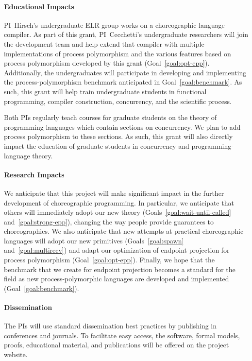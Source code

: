 \paragraph{Educational Impacts}
PI~Hirsch's undergraduate ELR group works on a choreographic-language compiler.
As part of this grant, PI~Cecchetti's undergraduate researchers will join the development team
and help extend that compiler with multiple implementations of process polymorphism and the various features based on process polymorphism developed by this grant (Goal~\ref{goal:opt-epp}).
Additionally, the undergraduates will participate in developing and implementing the process-polymorphism benchmark anticipated in Goal~\ref{goal:benchmark}.
As such, this grant will help train undergraduate students in functional programming, compiler construction, concurrency, and the scientific process.

Both PIs regularly teach courses for graduate students on the theory of programming languages which contain sections on concurrency.
We plan to add process polymorphism to these sections.
As such, this grant will also directly impact the education of graduate students in concurrency and programming-language theory.

\paragraph{Research Impacts}
We anticipate that this project will make significant impact in the further development of choreographic programming.
In particular, we anticipate that others will immediately adopt our new theory (Goals~\ref{goal:wait-until-called} and~\ref{goal:strong-epp}), changing the way people provide guarantees to choreographies.
We also anticipate that new attempts at practical choreographic languages will adopt our new primitives (Goals~\ref{goal:spawn} and~\ref{goal:multirecv}) and adapt our optimization of endpoint projection for process polymorphism (Goal~\ref{goal:opt-epp}).
Finally, we hope that the benchmark that we create for endpoint projection becomes a standard for the field as new process-polymorphic languages are developed and implemented (Goal~\ref{goal:benchmark}).

\paragraph{Dissemination}
The PIs will use standard dissemination best practices by publishing in conferences and journals.
To facilitate easy access, the software, formal models, proofs, educational material, and publications will be offered on the project website. 

